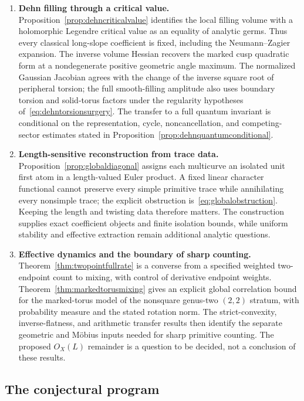 \documentclass[11pt,a4paper]{article}
\numberwithin{equation}{section}
\theoremstyle{definition}
\theoremstyle{remark}
\begin{document}
\begin{enumerate}[leftmargin=*,label=\textbf{\arabic*.}]
\item \textbf{Dehn filling through a critical value.}
Proposition~\ref{prop:dehncriticalvalue} identifies the local filling
volume with a holomorphic Legendre critical value as an equality of
analytic germs. Thus every classical long-slope coefficient is fixed,
including the Neumann--Zagier expansion. The inverse volume Hessian
recovers the marked cusp quadratic form at a nondegenerate positive
geometric angle maximum. The normalized Gaussian Jacobian agrees with the
change of the inverse square root of peripheral torsion; the full
smooth-filling amplitude also uses boundary torsion and solid-torus
factors under the regularity
hypotheses of~\eqref{eq:dehntorsionsurgery}. The transfer to a full
quantum invariant is conditional on the representation, cycle,
noncancellation, and competing-sector estimates stated in
Proposition~\ref{prop:dehnquantumconditional}.

\item \textbf{Length-sensitive reconstruction from trace data.}
Proposition~\ref{prop:globaldiagonal} assigns each multicurve an
isolated unit first atom in a length-valued Euler product. A fixed
linear character functional cannot preserve every simple primitive
trace while annihilating every nonsimple trace; the explicit obstruction
is~\eqref{eq:globalobstruction}. Keeping the length and twisting data
therefore matters. The construction supplies exact coefficient objects
and finite isolation bounds, while uniform stability and effective
extraction remain additional analytic questions.

\item \textbf{Effective dynamics and the boundary of sharp counting.}
Theorem~\ref{thm:twopointfullrate} is a converse from a specified weighted
two-endpoint count to mixing, with control of derivative endpoint
weights. Theorem~\ref{thm:markedtorusmixing} gives an explicit global
correlation bound for the marked-torus model of the nonsquare genus-two
$(2,2)$ stratum, with probability measure and the stated rotation norm.
The strict-convexity, inverse-flatness, and arithmetic
transfer results then identify the separate geometric and M\"obius
inputs needed for sharp primitive counting. The proposed $O_X(L)$
remainder is a question to be decided, not a conclusion of these results.
\end{enumerate}

\subsection*{The conjectural program}
\end{document}
